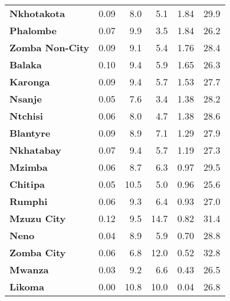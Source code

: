 \begin{tabular}{lrrrrr}
\textbf{Nkhotakota    } &        0.09 &         8.0 &          5.1 &             1.84 &        29.9 \\
\textbf{Phalombe      } &        0.07 &         9.9 &          3.5 &             1.84 &        26.2 \\
\textbf{Zomba Non-City} &        0.09 &         9.1 &          5.4 &             1.76 &        28.4 \\
\textbf{Balaka        } &        0.10 &         9.4 &          5.9 &             1.65 &        26.3 \\
\textbf{Karonga       } &        0.09 &         9.4 &          5.7 &             1.53 &        27.7 \\
\textbf{Nsanje        } &        0.05 &         7.6 &          3.4 &             1.38 &        28.2 \\
\textbf{Ntchisi       } &        0.06 &         8.0 &          4.7 &             1.38 &        28.6 \\
\textbf{Blantyre      } &        0.09 &         8.9 &          7.1 &             1.29 &        27.9 \\
\textbf{Nkhatabay     } &        0.07 &         9.4 &          5.7 &             1.19 &        27.3 \\
\textbf{Mzimba        } &        0.06 &         8.7 &          6.3 &             0.97 &        29.5 \\
\textbf{Chitipa       } &        0.05 &        10.5 &          5.0 &             0.96 &        25.6 \\
\textbf{Rumphi        } &        0.06 &         9.3 &          6.4 &             0.93 &        27.0 \\
\textbf{Mzuzu City    } &        0.12 &         9.5 &         14.7 &             0.82 &        31.4 \\
\textbf{Neno          } &        0.04 &         8.9 &          5.9 &             0.70 &        28.8 \\
\textbf{Zomba City    } &        0.06 &         6.8 &         12.0 &             0.52 &        32.8 \\
\textbf{Mwanza        } &        0.03 &         9.2 &          6.6 &             0.43 &        26.5 \\
\textbf{Likoma        } &        0.00 &        10.8 &         10.0 &             0.04 &        26.8 \\
\bottomrule
\end{tabular}

